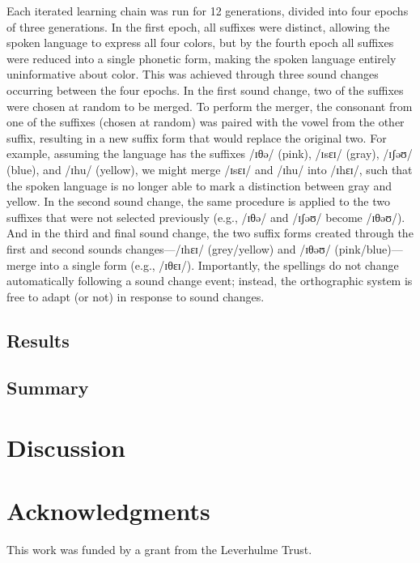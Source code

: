 \documentclass[doc,biblatex]{apa7}
\begin{document}
Each iterated learning chain was run for 12 generations, divided into four epochs of three generations. In the first epoch, all suffixes were distinct, allowing the spoken language to express all four colors, but by the fourth epoch all suffixes were reduced into a single phonetic form, making the spoken language entirely uninformative about color. This was achieved through three sound changes occurring between the four epochs. In the first sound change, two of the suffixes were chosen at random to be merged. To perform the merger, the consonant from one of the suffixes (chosen at random) was paired with the vowel from the other suffix, resulting in a new suffix form that would replace the original two. For example, assuming the language has the suffixes /ɪθə/ (pink), /ɪsɛɪ/ (gray), /ɪʃəʊ/ (blue), and /ɪhu/ (yellow), we might merge /ɪsɛɪ/ and /ɪhu/ into /ɪhɛɪ/, such that the spoken language is no longer able to mark a distinction between gray and yellow. In the second sound change, the same procedure is applied to the two suffixes that were not selected previously (e.g., /ɪθə/ and /ɪʃəʊ/ become /ɪθəʊ/). And in the third and final sound change, the two suffix forms created through the first and second sounds changes---/ɪhɛɪ/ (grey/yellow) and /ɪθəʊ/ (pink/blue)---merge into a single form (e.g., /ɪθɛɪ/). Importantly, the spellings do not change automatically following a sound change event; instead, the orthographic system is free to adapt (or not) in response to sound changes.



\subsection{Results}



\subsection{Summary}


\section{Discussion}


\section{Acknowledgments}

\noindent This work was funded by a grant from the Leverhulme Trust.

\printbibliography
\end{document}
